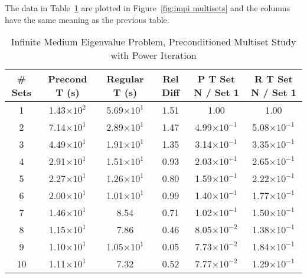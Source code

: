 The data in Table~\ref{table:impi multisets} are plotted in Figure~\ref{fig:impi multisets} and the columns have the same meaning as the previous table. 
\begin{table}[!h]
\caption{Infinite Medium Eigenvalue Problem, Preconditioned Multiset Study with Power Iteration}
\begin{center}
\begin{tabular}{c c c c c c}
\hline
\# Sets & Precond T (s) & Regular T (s) & Rel Diff & P T Set N / Set 1 & R T Set N / Set 1 \\[0.5ex]
\hline
1   & 1.43$\times 10^{2}$ & 5.69$\times 10^{1}$ & 1.51 & 1.00                                & 1.00 \\
2   & 7.14$\times 10^{1}$ & 2.89$\times 10^{1}$ & 1.47 & 4.99$\times 10^{-1}$  & 5.08$\times 10^{-1}$ \\
3   & 4.49$\times 10^{1}$ & 1.91$\times 10^{1}$ & 1.35 & 3.14$\times 10^{-1}$  & 3.35$\times 10^{-1}$ \\ 
4   & 2.91$\times 10^{1}$ & 1.51$\times 10^{1}$ & 0.93 & 2.03$\times 10^{-1}$  & 2.65$\times 10^{-1}$ \\
5   & 2.27$\times 10^{1}$ & 1.26$\times 10^{1}$ & 0.80 & 1.59$\times 10^{-1}$  & 2.22$\times 10^{-1}$ \\
6   & 2.00$\times 10^{1}$ & 1.01$\times 10^{1}$ & 0.99 & 1.40$\times 10^{-1}$  & 1.77$\times 10^{-1}$ \\
7   & 1.46$\times 10^{1}$ & 8.54                             & 0.71 & 1.02$\times 10^{-1}$  & 1.50$\times 10^{-1}$ \\
8   & 1.15$\times 10^{1}$ & 7.86                             & 0.46 & 8.05$\times 10^{-2}$  & 1.38$\times 10^{-1}$ \\
9   & 1.10$\times 10^{1}$ & 1.05$\times 10^{1}$ & 0.05 & 7.73$\times 10^{-2}$  & 1.84$\times 10^{-1}$ \\
10 & 1.11$\times 10^{1}$ & 7.32                             & 0.52 & 7.77$\times 10^{-2}$  & 1.29$\times 10^{-1}$ \\
\hline 
\end{tabular} 
\end{center}
\label{table:impi multisets}
\end{table}